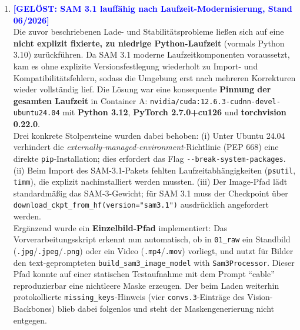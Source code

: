 \documentclass[12pt,a4paper]{article}
\begin{document}
\begin{enumerate}
\begin{itemize}
                \item \textit{Das Übersetzungs-Missverständnis (Leere Maskenergebnisse):} Die KI hat das Kabel im Video zwar erfolgreich gefunden und markiert, dies aber in einer neuen „fremden Sprache“ (einem veränderten Ausgabeformat) dokumentiert. Unser Empfänger-Skript suchte die Ergebnisse beharrlich am alten Ablageort und meldete fälschlicherweise „nichts gefunden“. Der neu geschriebene Parser übersetzt diese neue Struktur nun fehlerfrei, wodurch die erzeugten Kabelmasken exakt erfassungskonform abgespeichert werden können.
            \end{itemize}
        \item \textcolor{blue}{\textbf{[GELÖST: SAM 3.1 lauffähig nach Laufzeit-Modernisierung, Stand 06/2026]}} \\
            Die zuvor beschriebenen Lade- und Stabilitätsprobleme ließen sich auf eine \textbf{nicht explizit fixierte, zu niedrige Python-Laufzeit} (vormals Python 3.10) zurückführen. Da SAM 3.1 moderne Laufzeitkomponenten voraussetzt, kam es ohne explizite Versionsfestlegung wiederholt zu Import- und Kompatibilitätsfehlern, sodass die Umgebung erst nach mehreren Korrekturen wieder vollständig lief. Die Lösung war eine konsequente \textbf{Pinnung der gesamten Laufzeit} in Container A: \texttt{nvidia/cuda:12.6.3-cudnn-devel-ubuntu24.04} mit \textbf{Python 3.12}, \textbf{PyTorch 2.7.0+cu126} und \textbf{torchvision 0.22.0}. \\
            Drei konkrete Stolpersteine wurden dabei behoben: (i) Unter Ubuntu 24.04 verhindert die \textit{externally-managed-environment}-Richtlinie (PEP 668) eine direkte \texttt{pip}-Installation; dies erfordert das Flag \texttt{-{}-break-system-packages}. (ii) Beim Import des SAM-3.1-Pakets fehlten Laufzeitabhängigkeiten (\texttt{psutil}, \texttt{timm}), die explizit nachinstalliert werden mussten. (iii) Der Image-Pfad lädt standardmäßig das SAM-3-Gewicht; für SAM 3.1 muss der Checkpoint über \texttt{download\_ckpt\_from\_hf(version="sam3.1")} ausdrücklich angefordert werden. \\
            Ergänzend wurde ein \textbf{Einzelbild-Pfad} implementiert: Das Vorverarbeitungsskript erkennt nun automatisch, ob in \texttt{01\_raw} ein Standbild (\texttt{.jpg}/\texttt{.jpeg}/\texttt{.png}) oder ein Video (\texttt{.mp4}/\texttt{.mov}) vorliegt, und nutzt für Bilder den text-geprompteten \texttt{build\_sam3\_image\_model} with \texttt{Sam3Processor}. Dieser Pfad konnte auf einer statischen Testaufnahme mit dem Prompt ``cable'' reproduzierbar eine nichtleere Maske erzeugen. Der beim Laden weiterhin protokollierte \texttt{missing\_keys}-Hinweis (vier \texttt{convs.3}-Einträge des Vision-Backbones) blieb dabei folgenlos und steht der Maskengenerierung nicht entgegen.

\end{enumerate}
\end{document}
